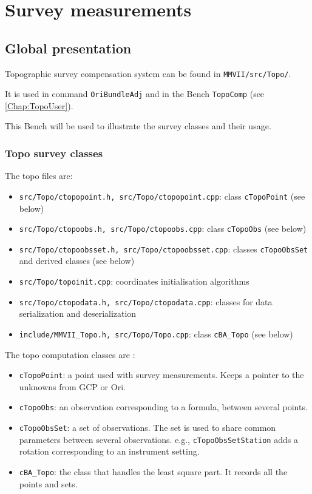 
\section{Survey measurements}
\label{Chap:TopoProg}
\subsection{Global presentation}

Topographic survey compensation system can be found in \texttt{MMVII/src/Topo/}.

It is used in command \texttt{OriBundleAdj} and in the Bench \texttt{TopoComp} (see \ref{Chap:TopoUser}).

This Bench will be used to illustrate the survey classes and their usage.


\subsubsection{Topo survey classes}

The topo files are:
 \begin{itemize}
    \item \texttt{src/Topo/ctopopoint.h, src/Topo/ctopopoint.cpp}: class \texttt{cTopoPoint} (see below)
    \item \texttt{src/Topo/ctopoobs.h, src/Topo/ctopoobs.cpp}: class \texttt{cTopoObs} (see below)
    \item \texttt{src/Topo/ctopoobsset.h, src/Topo/ctopoobsset.cpp}: classes \texttt{cTopoObsSet} and derived classes (see below)
    \item \texttt{src/Topo/topoinit.cpp}: coordinates initialisation algorithms
    \item \texttt{src/Topo/ctopodata.h, src/Topo/ctopodata.cpp}: classes for data serialization and deserialization
    \item \texttt{include/MMVII\_Topo.h, src/Topo/Topo.cpp}: class \texttt{cBA\_Topo} (see below)
 \end{itemize}

The topo computation classes are :
 \begin{itemize}
    \item \texttt{cTopoPoint}: a point used with survey measurements. Keeps a pointer to the unknowns from GCP or Ori.
    \item \texttt{cTopoObs}: an observation corresponding to a formula, between several points.
    \item \texttt{cTopoObsSet}: a set of observations. The set is used to share common parameters between several observations. e.g., \texttt{cTopoObsSetStation} adds a rotation corresponding to an instrument setting.   
    \item \texttt{cBA\_Topo}: the class that handles the least square part. It records all the points and sets.
 \end{itemize}

